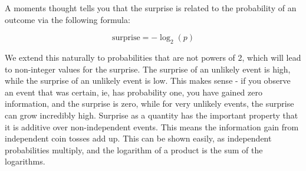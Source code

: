 \documentclass{article}
\begin{document}
\begin{figure}[H]
	\centering
\end{figure}

A moments thought tells you that the surprise is related to the probability of an outcome via the following formula:

\begin{equation*}
	\text{surprise} = -\log_2(p)
\end{equation*}

We extend this naturally to probabilities that are not powers of 2, which will lead to non-integer values for the surprise. The surprise of an unlikely event is high, while the surprise of an unlikely event is low. This makes sense - if you observe an event that was certain, ie, has probability one, you have gained zero information, and the surprise is zero, while for very unlikely events, the surprise can grow incredibly high. Surprise as a quantity has the important property that it is additive over non-independent events. This means the information gain from independent coin tosses add up. This can be shown easily, as independent probabilities multiply, and the logarithm of a product is the sum of the logarithms.\\
\end{document}
